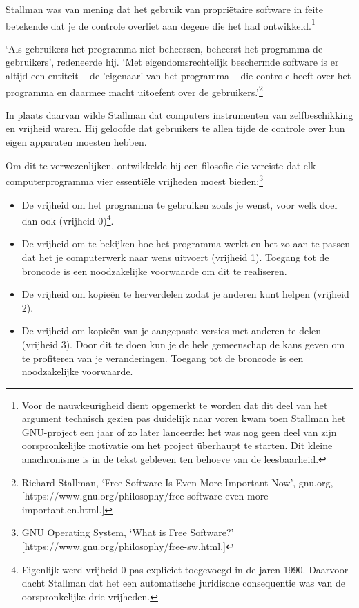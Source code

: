 \documentclass[
  a5paper,
  smalldemyvopaper,11pt,twoside,onecolumn,openright,extrafontsizes]{memoir}
\begin{document}
Stallman was van mening dat het gebruik van propriëtaire software in
feite betekende dat je de controle overliet aan degene die het had
ontwikkeld.\footnote{Voor de nauwkeurigheid dient opgemerkt te worden
  dat dit deel van het argument technisch gezien pas duidelijk naar
  voren kwam toen Stallman het GNU-project een jaar of zo later
  lanceerde: het was nog geen deel van zijn oorspronkelijke motivatie om
  het project überhaupt te starten. Dit kleine anachronisme is in de
  tekst gebleven ten behoeve van de leesbaarheid.}

`Als gebruikers het programma niet beheersen, beheerst het programma de
gebruikers', redeneerde hij. `Met eigendomsrechtelijk beschermde
software is er altijd een entiteit -- de 'eigenaar' van het programma --
die controle heeft over het programma en daarmee macht uitoefent over de
gebruikers.'\footnote{\hspace{0pt}Richard Stallman, `Free Software Is
  Even More Important Now', gnu.org,
  {[}https://www.gnu.org/philosophy/free-software-even-more-important.en.html.{]}}

In plaats daarvan wilde Stallman dat computers instrumenten van
zelfbeschikking en vrijheid waren. Hij geloofde dat gebruikers te allen
tijde de controle over hun eigen apparaten moesten hebben.

Om dit te verwezenlijken, ontwikkelde hij een filosofie die vereiste dat
elk computerprogramma vier essentiële vrijheden moest bieden:\footnote{\hspace{0pt}GNU
  Operating System, `What is Free Software?'
  {[}https://www.gnu.org/philosophy/free-sw.html.{]}}

\begin{itemize}
\item
  De vrijheid om het programma te gebruiken zoals je wenst, voor welk
  doel dan ook (vrijheid 0)\footnote{Eigenlijk werd vrijheid 0 pas
    expliciet toegevoegd in de jaren 1990. Daarvoor dacht Stallman dat
    het een automatische juridische consequentie was van de
    oorspronkelijke drie vrijheden.}.
\item
  De vrijheid om te bekijken hoe het programma werkt en het zo aan te
  passen dat het je computerwerk naar wens uitvoert (vrijheid 1).
  Toegang tot de broncode is een noodzakelijke voorwaarde om dit te
  realiseren.
\item
  De vrijheid om kopieën te herverdelen zodat je anderen kunt helpen
  (vrijheid 2).
\item
  De vrijheid om kopieën van je aangepaste versies met anderen te delen
  (vrijheid 3). Door dit te doen kun je de hele gemeenschap de kans
  geven om te profiteren van je veranderingen. Toegang tot de broncode
  is een noodzakelijke voorwaarde.
\end{itemize}
\end{document}
